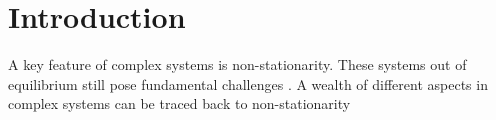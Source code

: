 \section{Introduction}\label{sec:introduction}

A key feature of complex systems is non-stationarity. These
systems out of equilibrium still pose fundamental challenges
\cite{comp_sys_1,comp_sys_2,comp_sys_3,comp_sys_4}. A wealth of different
aspects in complex systems can be traced back to non-stationarity
\cite{non_stat_1,non_stat_2}